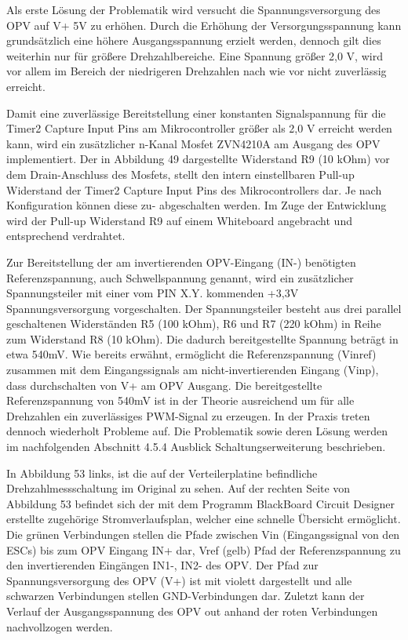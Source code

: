 Als erste Lösung der Problematik wird versucht die Spannungsversorgung des OPV auf V+ 5V zu erhöhen. Durch die Erhöhung der Versorgungsspannung kann grundsätzlich eine höhere Ausgangsspannung erzielt werden, dennoch gilt dies weiterhin nur für größere Drehzahlbereiche. Eine Spannung größer 2,0 V, wird vor allem im Bereich der niedrigeren Drehzahlen nach wie vor nicht zuverlässig erreicht.\vspace{11pt}


Damit eine zuverlässige Bereitstellung einer konstanten Signalspannung für die Timer2 Capture Input Pins am Mikrocontroller größer als 2,0 V erreicht werden kann, wird ein zusätzlicher n-Kanal Mosfet ZVN4210A am Ausgang des OPV implementiert. Der in Abbildung 49 dargestellte Widerstand R9 (10 kOhm) vor dem Drain-Anschluss des Mosfets, stellt den intern einstellbaren Pull-up Widerstand der Timer2 Capture Input Pins des Mikrocontrollers dar. Je nach Konfiguration können diese zu- abgeschalten werden. Im Zuge der Entwicklung wird der Pull-up Widerstand R9 auf einem Whiteboard angebracht und entsprechend verdrahtet.\vspace{11pt}

Zur Bereitstellung der am invertierenden OPV-Eingang (IN-) benötigten Referenzspannung, auch Schwellspannung genannt, wird ein zusätzlicher Spannungsteiler mit einer vom PIN X.Y. kommenden +3,3V Spannungsversorgung vorgeschalten. Der Spannungsteiler besteht aus drei parallel geschaltenen Widerständen R5 (100 kOhm), R6 und R7 (220 kOhm) in Reihe zum Widerstand R8 (10 kOhm). Die dadurch bereitgestellte Spannung beträgt in etwa 540mV.  Wie bereits erwähnt, ermöglicht die Referenzspannung (Vinref) zusammen mit dem Eingangssignals am nicht-invertierenden Eingang (Vinp), dass durchschalten von V+ am OPV Ausgang. Die bereitgestellte Referenzspannung von 540mV ist in der Theorie ausreichend um für alle Drehzahlen ein zuverlässiges PWM-Signal zu erzeugen. In der Praxis treten dennoch wiederholt Probleme auf. Die Problematik sowie deren Lösung werden im nachfolgenden Abschnitt 4.5.4 \glqq{}Ausblick Schaltungserweiterung\grqq{} beschrieben. \vspace{11pt}

In Abbildung 53 links, ist die auf der Verteilerplatine befindliche Drehzahlmessschaltung im Original zu sehen. Auf der rechten Seite von Abbildung 53 befindet sich der mit dem Programm BlackBoard Circuit Designer erstellte zugehörige Stromverlaufsplan, welcher eine schnelle Übersicht ermöglicht. Die grünen Verbindungen stellen die Pfade zwischen Vin (Eingangssignal von den ESCs) bis zum OPV Eingang IN+ dar, Vref (gelb) Pfad der Referenzspannung zu den invertierenden Eingängen IN1-, IN2- des OPV. Der Pfad zur Spannungsversorgung des OPV (V+) ist mit violett dargestellt und alle schwarzen Verbindungen stellen GND-Verbindungen dar. Zuletzt kann der Verlauf der Ausgangsspannung des OPV out anhand der roten Verbindungen nachvollzogen werden. 

